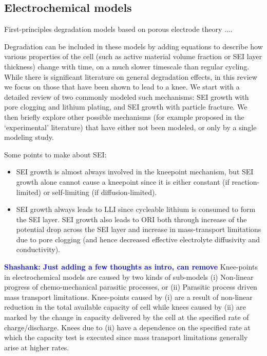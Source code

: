 \documentclass{article}
\newcommand{\ssr}[1]{{\textbf{\textcolor{blue}{Shashank: #1}}}}
\begin{document}
\subsection{Electrochemical models}

First-principles degradation models based on porous electrode theory \cite{doyle1993modeling} .... 

Degradation can be included in these models by adding equations to describe how various properties of the cell (such as active material volume fraction or SEI layer thickness) change with time, on a much slower timescale than regular cycling.
While there is significant literature on general degradation effects, in this review we focus on those that have been shown to lead to a knee.
We start with a detailed review of two commonly modeled such mechanisms: SEI growth with pore clogging and lithium plating, and SEI growth with particle fracture.
We then briefly explore other possible mechanisms (for example proposed in the `experimental' literature) that have either not been modeled, or only by a single modeling study.

Some points to make about SEI:
\begin{itemize}
    \item SEI growth is almost always involved in the kneepoint mechanism, but SEI growth alone cannot cause a kneepoint since it is either constant (if reaction-limited) or self-limiting (if diffusion-limited).
    \item SEI growth always leads to LLI since cycleable lithium is consumed to form the SEI layer. SEI growth also leads to ORI both through increase of the potential drop across the SEI layer and increase in mass-transport limitations due to pore clogging (and hence decreased effective electrolyte diffusivity and conductivity).
\end{itemize}

\ssr{Just adding a few thoughts as intro, can remove} Knee-points in electrochemical models are caused by two kinds of sub-models (i) Non-linear progress of chemo-mechanical parasitic processes, or (ii) Parasitic process driven mass transport limitations. Knee-points caused by (i) are a result of non-linear reduction in the total available capacity of cell while knees caused by (ii) are marked by the change in capacity delivered by the cell at the specified rate of charge/discharge. Knees due to (ii) have a dependence on the specified rate at which the capacity test is executed since mass transport limitations generally arise at higher rates.
\end{document}
